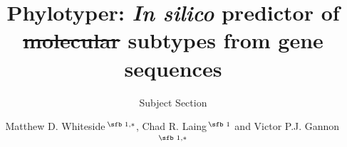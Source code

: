 \documentclass{bioinfo}
\providecommand{\DIFdel}[1]{{\protect\color{red}\sout{#1}}}                      %
\providecommand{\DIFdelbegin}{} %
\providecommand{\DIFdelend}{} %
\begin{document}

\subtitle{Subject Section}

\title[short Title]{Phylotyper: {\it In silico} predictor of \DIFdelbegin \DIFdel{molecular }\DIFdelend subtypes from gene sequences}
\author[Whiteside \textit{et~al}.]{Matthew D. Whiteside\,$^{\text{\sfb 1,}*}$, Chad R. Laing\,$^{\text{\sfb 1}}$ and Victor P.J. Gannon\,$^{\text{\sfb 1,}*}$}
\address{$^{\text{\sf 1}}$National Microbiology Laboratory, Public Health Agency of Canada, Lethbridge, AB, Canada, T1J 3Z4}



\end{document}
